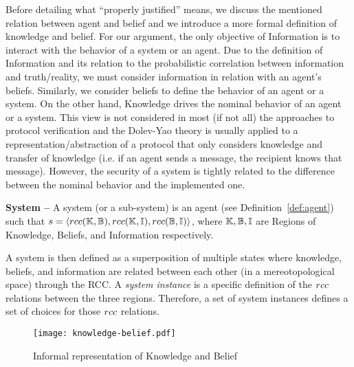 Before detailing what ``properly justified'' means, we discuss the mentioned
relation between agent and belief and we introduce a more formal definition
of knowledge and belief. For our argument, the only objective of
Information is to interact with the behavior of a system or an agent. 
Due to the definition of Information and its relation to the probabilistic
correlation between information and truth/reality, we must consider
information in relation with an agent's beliefs. Similarly, we consider
beliefs to define the behavior of an agent or a system. On the other hand,
Knowledge drives the nominal behavior of an agent or a system. This view
is not considered in most (if not all) the approaches to protocol verification
and the Dolev-Yao theory is usually applied to a representation/abstraction
of a protocol that only considers knowledge and transfer of knowledge (i.e.
if an agent sends a message, the recipient knows that message). However,
the security of a system is tightly related to the difference between
the nominal behavior and the implemented one.

\begin{definition}{\bf System --}\label{def:system}
	A system (or a sub-system) is an agent (see Definition~\ref{def:agent})
	such that
	$s=\langle rcc(\mathbb{K},\mathbb{B}),rcc(\mathbb{K},\mathbb{I}),rcc(\mathbb{B},\mathbb{I})\rangle$,
	where $\mathbb{K},\mathbb{B},\mathbb{I}$ are Regions of Knowledge, Beliefs, and Information respectively.
\end{definition}
A system is then defined as a superposition of multiple states where knowledge,
beliefs, and information are related between each other (in a mereotopological
space) through the RCC. A \emph{system instance} is a specific definition of
the $rcc$ relations between the three regions. Therefore, a set of 
system instances defines a set of choices for those $rcc$ relations.


\begin{figure}[t]
	\centering
	\texttt{[image: knowledge-belief.pdf]}
	\caption{Informal representation of Knowledge and Belief}
	\label{fig:knowledge-belief}
\end{figure}

